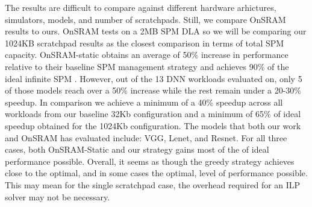 The results are difficult to compare against different hardware arhictures,
simulators, models, and number of scratchpads. Still, we compare OnSRAM results
to ours. OnSRAM tests on a 2MB SPM DLA so we will be comparing our 1024KB
scratchpad results as the closest comparison in terms of total SPM capacity.
OnSRAM-static obtains an average of 50\% increase in performance relative to
their baseline SPM management strategy and achieves 90\% of the ideal infinite
SPM \cite{onsram}. However, out of the 13 DNN workloads evaluated on, only 5 of
those models reach over a 50\% increase while the rest remain under a 20-30\%
speedup. In comparison we achieve a minimum of a 40\% speedup across all
workloads from our baseline 32Kb configuration and a minimum of 65\% of ideal
speedup obtained for the 1024Kb configuration. The models that both our work
and OnSRAM has evaluated include: VGG, Lenet, and Resnet. For all three cases,
both OnSRAM-Static and our strategy gains most of the of ideal performance
possible.  Overall, it seems as though the greedy strategy achieves close to
the optimal, and in some cases the optimal, level of performance possible. This
may mean for the single scratchpad case, the overhead required for an ILP
solver may not be necessary.




